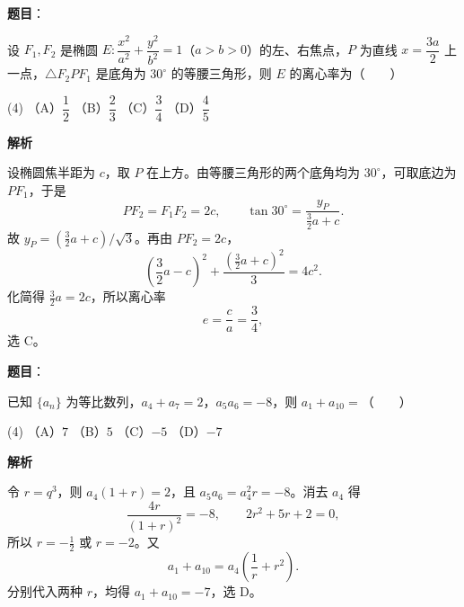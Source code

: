 \begin{answer}

\textbf{题目}：

设 $F_1,F_2$ 是椭圆 $E:\dfrac{x^2}{a^2}+\dfrac{y^2}{b^2}=1$（$a>b>0$）的左、右焦点，$P$ 为直线 $x=\dfrac{3a}{2}$ 上一点，$\triangle F_2PF_1$ 是底角为 $30^\circ$ 的等腰三角形，则 $E$ 的离心率为\mbox{（　　）}

\begin{gkopts}(4)
\task （A）$\dfrac12$
\task （B）$\dfrac23$
\task （C）$\dfrac34$
\task （D）$\dfrac45$
\end{gkopts}

\textbf{解析}

设椭圆焦半距为 $c$，取 $P$ 在上方。由等腰三角形的两个底角均为 $30^\circ$，可取底边为 $PF_1$，于是
\nopagebreak[4]
\[
PF_2=F_1F_2=2c,\qquad
\tan30^\circ=\frac{y_P}{\frac32a+c}.
\]
故 $y_P=(\frac32a+c)/\sqrt3$。再由 $PF_2=2c$，
\nopagebreak[4]
\[
\left(\frac32a-c\right)^2+\frac{(\frac32a+c)^2}{3}=4c^2.
\]
化简得 $\frac32a=2c$，所以离心率
\nopagebreak[4]
\[
e=\frac ca=\frac34,
\]
选 C。


\end{answer}
\begin{answer}

\textbf{题目}：

已知 $\{a_n\}$ 为等比数列，$a_4+a_7=2$，$a_5a_6=-8$，则 $a_1+a_{10}=$\mbox{（　　）}

\begin{gkopts}(4)
\task （A）$7$
\task （B）$5$
\task （C）$-5$
\task （D）$-7$
\end{gkopts}

\textbf{解析}

令 $r=q^3$，则 $a_4(1+r)=2$，且 $a_5a_6=a_4^2r=-8$。消去 $a_4$ 得
\nopagebreak[4]
\[
\frac{4r}{(1+r)^2}=-8,\qquad
2r^2+5r+2=0,
\]
所以 $r=-\frac12$ 或 $r=-2$。又
\nopagebreak[4]
\[
a_1+a_{10}=a_4\left(\frac1r+r^2\right).
\]
分别代入两种 $r$，均得 $a_1+a_{10}=-7$，选 D。


\end{answer}

